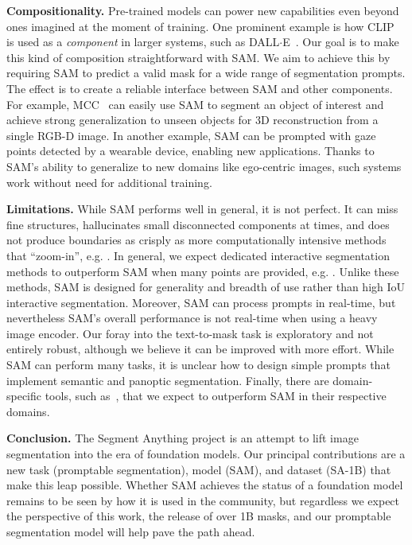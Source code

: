 \textbf{Compositionality.} Pre-trained models can power new capabilities even beyond ones imagined at the moment of training. One prominent example is how CLIP~\cite{Radford2021} is used as a \emph{component} in larger systems, such as DALL$\cdot$E~\cite{Ramesh2021}. Our goal is to make this kind of composition straightforward with SAM. We aim to achieve this by requiring SAM to predict a valid mask for a wide range of segmentation prompts. The effect is to create a reliable interface between SAM and other components. For example, MCC~\cite{wu2023multiview} can easily use SAM to segment an object of interest and achieve strong generalization to unseen objects for 3D reconstruction from a single RGB-D image. In another example, SAM can be prompted with gaze points detected by a wearable device, enabling new applications. Thanks to SAM's ability to generalize to new domains like ego-centric images, such systems work without need for additional training.

\textbf{Limitations.} While SAM performs well in general, it is not perfect. It can miss fine structures, hallucinates small disconnected components at times, and does not produce boundaries as crisply as more computationally intensive methods that ``zoom-in'', e.g. \cite{chen2022focalclick}. In general, we expect dedicated interactive segmentation methods to outperform SAM when many points are provided, e.g. \cite{liu2022simpleclick}. Unlike these methods, SAM is designed for generality and breadth of use rather than high IoU interactive segmentation. Moreover, SAM can process prompts in real-time, but nevertheless SAM's overall performance is not real-time when using a heavy image encoder. Our foray into the text-to-mask task is exploratory and not entirely robust, although we believe it can be improved with more effort. While SAM can perform many tasks, it is unclear how to design simple prompts that implement semantic and panoptic segmentation. Finally, there are domain-specific tools, such as~\cite{berg2019}, that we expect to outperform SAM in their respective domains.

\textbf{Conclusion.} The Segment Anything project is an attempt to lift image segmentation into the era of foundation models. Our principal contributions are a new task (promptable segmentation), model (SAM), and dataset (\mbox{SA-1B}) that make this leap possible. Whether SAM achieves the status of a foundation model remains to be seen by how it is used in the community, but regardless we expect the perspective of this work, the release of over 1B masks, and our promptable segmentation model will help pave the path ahead.

